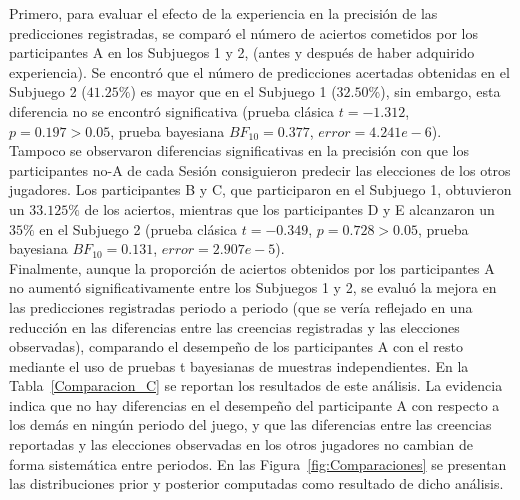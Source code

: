 Primero, para evaluar el efecto de la experiencia en la precisión de las predicciones registradas, se comparó el número de aciertos cometidos por los participantes A en los Subjuegos 1 y 2, (antes y después de haber adquirido experiencia). Se encontró que el número de predicciones acertadas obtenidas en el Subjuego 2 ($41.25\%$) es mayor que en el Subjuego 1 ($32.50\%$), sin embargo, esta diferencia no se encontró significativa (prueba clásica $t = -1.312$, $p = 0.197 > 0.05$, prueba bayesiana $BF_{10} = 0.377$, $error = 4.241e - 6$).\\

Tampoco se observaron diferencias significativas en la precisión con que los participantes no-A de cada Sesión consiguieron predecir las elecciones de los otros jugadores. Los participantes B y C, que participaron en el Subjuego 1, obtuvieron un $33.125\%$ de los aciertos, mientras que los participantes D y E alcanzaron un $35\%$ en el Subjuego 2 (prueba clásica $t = -0.349$, $p = 0.728 > 0.05$, prueba bayesiana $BF_{10} = 0.131$, $error = 2.907e - 5$).\\

Finalmente, aunque la proporción de aciertos obtenidos por los participantes A no aumentó significativamente entre los Subjuegos 1 y 2, se evaluó la mejora en las predicciones registradas periodo a periodo (que se vería reflejado en una reducción en las diferencias entre las creencias registradas y las elecciones observadas), comparando el desempeño de los participantes A con el resto mediante el uso de pruebas t bayesianas de muestras independientes. En la Tabla~\ref{Comparacion_C} se reportan los resultados de este análisis. La evidencia indica que no hay diferencias en el desempeño del participante A con respecto a los demás en ningún periodo del juego, y que las diferencias entre las creencias reportadas y las elecciones  observadas en los otros jugadores no cambian de forma sistemática entre periodos. En las Figura~\ref{fig:Comparaciones} se presentan las distribuciones prior y posterior computadas como resultado de dicho análisis.\\

